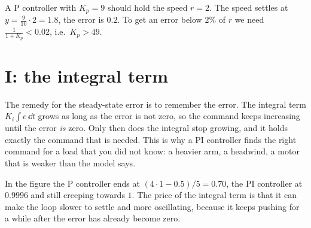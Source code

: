 \begin{example}
A P controller with $K_p=9$ should hold the speed $r=2$. The speed settles at $y=\frac{9}{10}\cdot2=1.8$, the error is $0.2$. To get an error below $2\%$ of $r$ we need $\frac{1}{1+K_p}<0.02$, i.e.\ $K_p>49$.
\end{example}

\section*{I: the integral term}
The remedy for the steady-state error is to remember the error. The integral term $K_i\int e\,\dd t$ grows as long as the error is not zero, so the command keeps increasing until the error \emph{is} zero. Only then does the integral stop growing, and it holds exactly the command that is needed. This is why a PI controller finds the right command for a load that you did not know: a heavier arm, a headwind, a motor that is weaker than the model says.

\begin{center}
\end{center}

In the figure the P controller ends at $(4\cdot1-0.5)/5=0.70$, the PI controller at $0.9996$ and still creeping towards $1$. The price of the integral term is that it can make the loop slower to settle and more oscillating, because it keeps pushing for a while after the error has already become zero.

